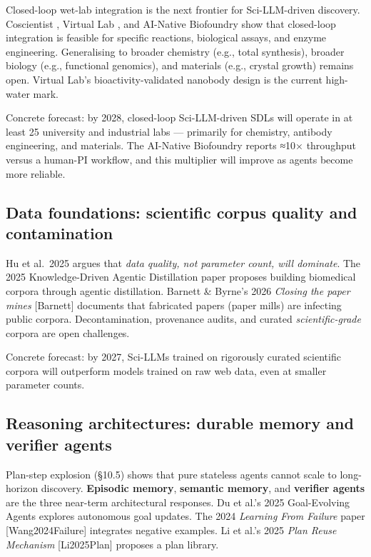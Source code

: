 \documentclass{article}
\begin{document}
Closed-loop wet-lab integration is the next frontier for Sci-LLM-driven discovery. Coscientist \cite{boiko2023nature6242023}, Virtual Lab \cite{swanson2024thevirtuallabaiage}, and AI-Native Biofoundry \cite{zhang2026anainativebiofound} show that closed-loop integration is feasible for specific reactions, biological assays, and enzyme engineering. Generalising to broader chemistry (e.g., total synthesis), broader biology (e.g., functional genomics), and materials (e.g., crystal growth) remains open. Virtual Lab's bioactivity-validated nanobody design \cite{swanson2024thevirtuallabaiage} is the current high-water mark.

Concrete forecast: by 2028, closed-loop Sci-LLM-driven SDLs will operate in at least 25 university and industrial labs --- primarily for chemistry, antibody engineering, and materials. The AI-Native Biofoundry \cite{zhang2026anainativebiofound} reports ≈10× throughput versus a human-PI workflow, and this multiplier will improve as agents become more reliable.

\subsection{Data foundations: scientific corpus quality and contamination}\label{data-foundations-scientific-corpus-quality-and-contamination}

Hu et al.~2025 \cite{hu2025asurveyofscientifi} argues that \emph{data quality, not parameter count, will dominate}. The 2025 Knowledge-Driven Agentic Distillation paper \cite{xiao2025knowledgedrivenage} proposes building biomedical corpora through agentic distillation. Barnett \& Byrne's 2026 \emph{Closing the paper mines} {[}Barnett{]} documents that fabricated papers (paper mills) are infecting public corpora. Decontamination, provenance audits, and curated \emph{scientific-grade} corpora are open challenges.

Concrete forecast: by 2027, Sci-LLMs trained on rigorously curated scientific corpora will outperform models trained on raw web data, even at smaller parameter counts.

\subsection{Reasoning architectures: durable memory and verifier agents}\label{reasoning-architectures-durable-memory-and-verifier-agents}

Plan-step explosion (§10.5) shows that pure stateless agents cannot scale to long-horizon discovery. \textbf{Episodic memory}, \textbf{semantic memory}, and \textbf{verifier agents} are the three near-term architectural responses. Du et al.'s 2025 Goal-Evolving Agents \cite{du2025acceleratingscient} explores autonomous goal updates. The 2024 \emph{Learning From Failure} paper {[}Wang2024Failure{]} integrates negative examples. Li et al.'s 2025 \emph{Plan Reuse Mechanism} {[}Li2025Plan{]} proposes a plan library.
\end{document}

